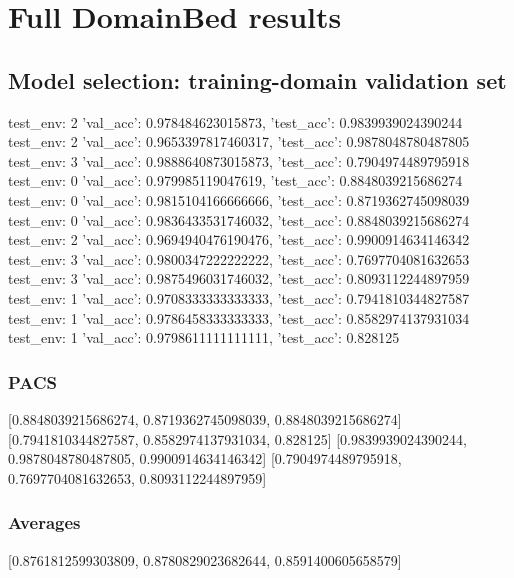 \documentclass{article}
\begin{document}
\section{Full DomainBed results}

\subsection{Model selection: training-domain validation set}
test_env: 2
{'val_acc': 0.978484623015873, 'test_acc': 0.9839939024390244}
test_env: 2
{'val_acc': 0.9653397817460317, 'test_acc': 0.9878048780487805}
test_env: 3
{'val_acc': 0.9888640873015873, 'test_acc': 0.7904974489795918}
test_env: 0
{'val_acc': 0.979985119047619, 'test_acc': 0.8848039215686274}
test_env: 0
{'val_acc': 0.9815104166666666, 'test_acc': 0.8719362745098039}
test_env: 0
{'val_acc': 0.9836433531746032, 'test_acc': 0.8848039215686274}
test_env: 2
{'val_acc': 0.9694940476190476, 'test_acc': 0.9900914634146342}
test_env: 3
{'val_acc': 0.9800347222222222, 'test_acc': 0.7697704081632653}
test_env: 3
{'val_acc': 0.9875496031746032, 'test_acc': 0.8093112244897959}
test_env: 1
{'val_acc': 0.9708333333333333, 'test_acc': 0.7941810344827587}
test_env: 1
{'val_acc': 0.9786458333333333, 'test_acc': 0.8582974137931034}
test_env: 1
{'val_acc': 0.9798611111111111, 'test_acc': 0.828125}

\subsubsection{PACS}
[0.8848039215686274, 0.8719362745098039, 0.8848039215686274]
[0.7941810344827587, 0.8582974137931034, 0.828125]
[0.9839939024390244, 0.9878048780487805, 0.9900914634146342]
[0.7904974489795918, 0.7697704081632653, 0.8093112244897959]

\begin{center}
\end{center}

\subsubsection{Averages}
[0.8761812599303809, 0.8780829023682644, 0.8591400605658579]

\begin{center}
\end{center}
\end{document}
